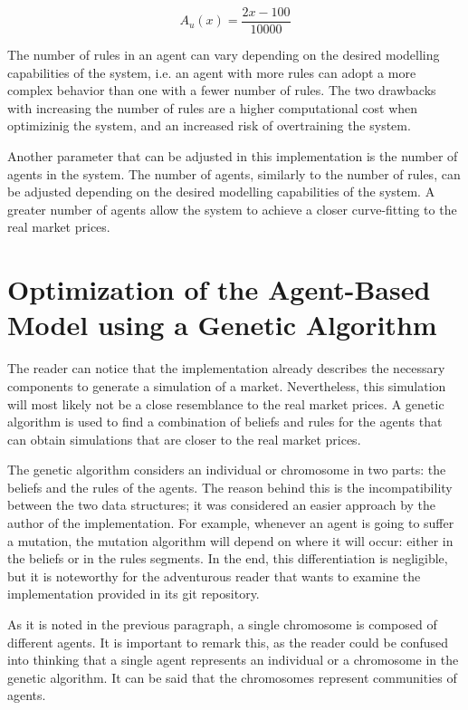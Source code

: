 \begin{equation}
  \label{eq:agent-trade-units}
  A_u(x) = \frac{2x - 100}{10000}
\end{equation}

The number of rules in an agent can vary depending on the desired modelling
capabilities of the system, i.e. an agent with more rules can adopt a more
complex behavior than one with a fewer number of rules. The two drawbacks with
increasing the number of rules are a higher computational cost when optimizinig
the system, and an increased risk of overtraining the system. %

Another parameter that can be adjusted in this implementation is the number of
agents in the system. The number of agents, similarly to the number of rules,
can be adjusted depending on the desired modelling capabilities of the system. A
greater number of agents allow the system to achieve a closer curve-fitting to
the real market prices.

\section{Optimization of the Agent-Based Model using a Genetic Algorithm}
\label{section:optimization-of-the-agent-based-model-using-a-genetic-algorithm}

The reader can notice that the implementation already describes 
the necessary components to generate a simulation of a
market. Nevertheless, this simulation will most likely not be a close
resemblance to the real market prices. A genetic algorithm is used to find a
combination of beliefs and rules for the agents that can obtain simulations that
are closer to the real market prices. %

The genetic algorithm considers an individual or chromosome in two parts: the
beliefs and the rules of the agents. The reason behind this is the
incompatibility between the two data structures; it was considered an easier
approach by the author of the implementation. For example, whenever an agent is
going to suffer a mutation, the mutation algorithm will depend on where it will
occur: either in the beliefs or in the rules segments. In the end, this
differentiation is negligible, but it is noteworthy for the adventurous reader
that wants to examine the implementation provided in its git repository.

As it is noted in the previous paragraph, a single chromosome is composed of
different agents. It is important to remark this, as the reader could be
confused into thinking that a single agent represents an individual or a
chromosome in the genetic algorithm. It can be said that the chromosomes
represent communities of agents.


